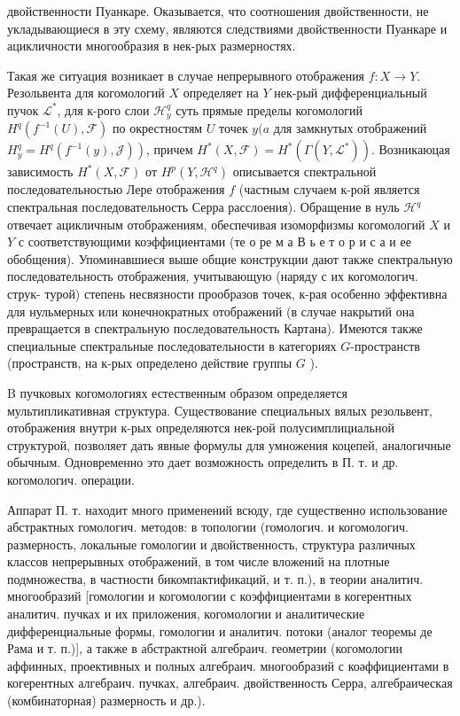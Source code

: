 \documentclass[10pt]{article}
\begin{document}
двойственности Пуанкаре. Оказывается, что соотношения двойственности, не укладывающиеся в эту схему, являются следствиями двойственности Пуанкаре и ацикличности многообразия в нек-рых размерностях.



Такая же ситуация возникает в случае непрерывного отображения $f: X \rightarrow Y$. Резольвента для когомологий $X$ определяет на $Y$ нек-рый дифференциальный пучок $\mathscr{L}^{*}$, для к-рого слои $\mathscr{H}_{y}^{q}$ суть прямые пределы когомологий $H^{q}\left(f^{-1}(U), \mathscr{F}\right)$ по окрестностям $U$ точек $y(a$ для замкнутых отображений $\left.H_{y}^{q}=H^{q}\left(f^{-1}(y), \mathscr{J}\right)\right)$, причем $H^{*}(X, \mathscr{F})=H^{*}\left(\Gamma\left(Y, \mathscr{L}^{*}\right)\right)$. Возникаюцая зависимость $H^{*}(X, \mathscr{F})$ от $H^{p}\left(Y, \mathscr{H}^{q}\right)$ описывается спектральной последовательностью Лере отображения $f$ (частным случаем к-рой является спектральная последовательность Серра расслоения). Обращение в нуль $\mathscr{H}^{q}$ отвечает ацикличным отображениям, обеспечивая изоморфизмы когомологий $X$ и $Y$ с соответствующими коэффициентами (те о ре м а В ь е т о р и с а и ее обобщения). Упоминавшиеся выше общие конструкции дают также спектральную последовательность отображения, учитывающую (наряду с их когомологич. струк- турой) степень несвязности прообразов точек, к-рая особенно эффективна для нульмерных или конечнократных отображений (в случае накрытий она превращается в спектральную последовательность Картана). Имеются также специальные спектральные последовательности в категориях $G$-пространств (пространств, на к-рых определено действие группы $G$ ).



B пучковых когомологиях естественным образом определяется мультипликативная структура. Существование специальных вялых резольвент, отображения внутри к-рых определяются нек-рой полусимплициальной структурой, позволяет дать явные формулы для умножения коцепей, аналогичные обычным. Одновременно это дает возможность определить в П. т. и др. когомологич. операции.



Аппарат П. т. находит много применений всюду, где существенно использование абстрактных гомологич. методов: в топологии (гомологич. и когомологич. размерность, локальные гомологии и двойственность, структура различных классов непрерывных отображений, в том числе вложений на плотные подмножества, в частности бикомпактификаций, и т. п.), в теории аналитич. многообразий [гомологии и когомологии с коэффициентами в когерентных аналитич. пучках и их приложения, когомологии и аналитические дифференциальные формы, гомологии и аналитич. потоки (аналог теоремы де Рама и т. п.)], а также в абстрактной алгебраич. геометрии (когомологии аффинных, проективных и полных алгебраич. многообразий с коәффициентами в когерентных алгебраич. пучках, алгебраич. двойственность Серра, алгебраическая (комбинаторная) размерность и др.).
\end{document}
